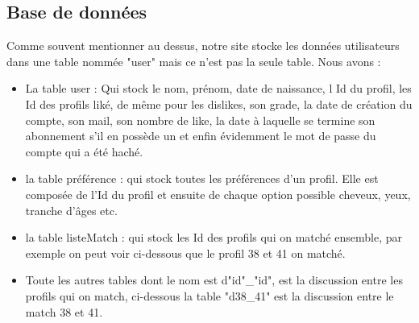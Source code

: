 \documentclass[12pt]{report}
\begin{document}
\subsection{Base de données}
	Comme souvent mentionner au dessus, notre site stocke les données utilisateurs dans une table nommée "user" mais ce n'est pas la seule table. Nous avons : \\
\begin{itemize}
	\item La table user : Qui stock le nom, prénom, date de naissance, l Id du profil, les Id des profils liké, de même pour les dislikes, son grade, la date de création du compte, son mail, son nombre de like, la date à laquelle se termine son abonnement s'il en possède un et enfin évidemment le mot de passe du compte qui a été haché.
	\item la table préférence : qui stock toutes les préférences d'un profil. Elle est composée de l'Id du profil et ensuite de chaque option possible cheveux, yeux, tranche d'âges etc.
	\item la table listeMatch : qui stock les Id des profils qui on matché ensemble, par exemple on peut voir ci-dessous que le profil 38 et 41 on matché.
	\item Toute les autres tables dont le nom est d"id"\_"id", est la discussion entre les profils qui on match, ci-dessous la table "d38\_41" est la discussion entre le match 38 et 41. 
\end{itemize}
\end{document}
